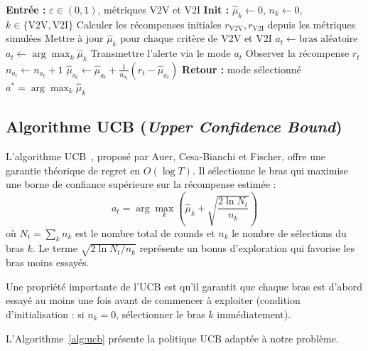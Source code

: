 \documentclass[12pt,a4paper]{article}
\begin{document}
\begin{algorithm}[H]
\caption{$\varepsilon$-Greedy pour la sélection V2V/V2I}
\label{alg:epsilon}
\begin{algorithmic}[1]
\State \textbf{Entrée :} $\varepsilon \in (0,1)$, métriques V2V et V2I
\State \textbf{Init :} $\hat{\mu}_k \leftarrow 0$, $n_k \leftarrow 0$,
       $k \in \{\text{V2V}, \text{V2I}\}$
\State Calculer les récompenses initiales $r_{\text{V2V}}, r_{\text{V2I}}$
       depuis les métriques simulées
\State Mettre à jour $\hat{\mu}_k$ pour chaque critère de V2V et V2I
    \State $a_t \leftarrow \text{bras aléatoire}$ 
  \Else
    \State $a_t \leftarrow \arg\max_k \hat{\mu}_k$ 
  \EndIf
  \State Transmettre l'alerte via le mode $a_t$
  \State Observer la récompense $r_t$
  \State $n_{a_t} \leftarrow n_{a_t} + 1$
  \State $\hat{\mu}_{a_t} \leftarrow \hat{\mu}_{a_t} +
         \frac{1}{n_{a_t}}(r_t - \hat{\mu}_{a_t})$
\EndFor
\State \textbf{Retour :} mode sélectionné $a^* = \arg\max_k \hat{\mu}_k$
\end{algorithmic}
\end{algorithm}

\subsection{Algorithme UCB (\textit{Upper Confidence Bound})}

L'algorithme UCB~\cite{auer2002}, proposé par Auer, Cesa-Bianchi et Fischer,
offre une garantie théorique de regret en $O(\log T)$. Il sélectionne le bras
qui maximise une borne de confiance supérieure sur la récompense estimée :
\begin{equation}
  a_t = \arg\max_{k} \left( \hat{\mu}_k + \sqrt{\frac{2 \ln N_t}{n_k}} \right)
\end{equation}
où $N_t = \sum_k n_k$ est le nombre total de rounds et $n_k$ le nombre de
sélections du bras $k$. Le terme $\sqrt{2\ln N_t / n_k}$ représente un bonus
d'exploration qui favorise les bras moins essayés.

Une propriété importante de l'UCB est qu'il garantit que chaque bras est d'abord
essayé au moins une fois avant de commencer à exploiter (condition d'initialisation :
si $n_k = 0$, sélectionner le bras $k$ immédiatement).

L'Algorithme~\ref{alg:ucb} présente la politique UCB adaptée à notre problème.
\end{document}
